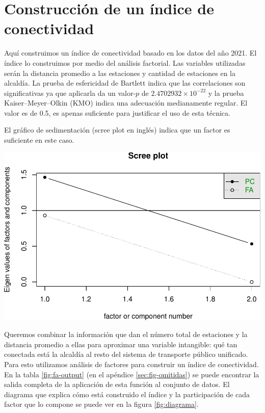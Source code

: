 \documentclass[
  spanish,
]{article}
\begin{document}
\hypertarget{construcciuxf3n-de-un-uxedndice-de-conectividad}{%
\section{Construcción de un índice de
conectividad}\label{construcciuxf3n-de-un-uxedndice-de-conectividad}}

Aquí construimos un índice de conectividad basado en los datos del año
2021. El índice lo construimos por medio del análisis factorial. Las
variables utilizadas serán la distancia promedio a las estaciones y
cantidad de estaciones en la alcaldía. La prueba de esfericidad de
Bartlett indica que las correlaciones son significativas ya que
aplicarla da un valor-\(p\) de \ensuremath{2.4702932\times 10^{-22}} y
la prueba Kaiser--Meyer--Olkin (KMO) indica una adecuación medianamente
regular. El valor es de 0.5, es apenas suficiente para justificar el uso
de esta técnica.

El gráfico de sedimentación (scree plot en inglés) indica que un factor
es suficiente en este caso.

\begin{center}\includegraphics{proyecto_files/figure-latex/unnamed-chunk-20-1} \end{center}

Queremos combinar la información que dan el número total de estaciones y
la distancia promedio a ellas para aproximar una variable intangible:
qué tan conectada está la alcaldía al resto del sistema de transporte
público unificado. Para esto utilizamos análisis de factores para
construir un índice de conectividad. En la tabla \ref{fig:fa-output} (en
el apéndice \ref{sec:fig-omitidas}) se puede encontrar la salida
completa de la aplicación de esta función al conjunto de datos. El
diagrama que explica cómo está construido el índice y la participación
de cada factor que lo compone se puede ver en la figura
\ref{fig:diagrama}.
\end{document}
